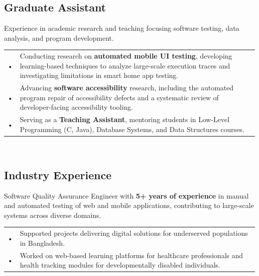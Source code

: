 \documentclass[a4paper]{MagicalCV}
\renewcommand{\sectionsep}{\vspace{2pt}}
\begin{document}
\begin{minipage}[t]{0.66\textwidth}
\sectionsep

\subsection{Graduate Assistant}
Experience in academic research and teaching focusing software testing, data analysis, and program development.

\begin{tabular}{@{}p{0.02cm}p{11cm}@{}}
• & Conducting research on \textbf{automated mobile UI testing}, developing learning-based techniques to analyze large-scale execution traces and investigating limitations in smart home app testing. \\
• & Advancing \textbf{software accessibility} research, including the automated program repair of accessibility defects and a systematic review of developer-facing accessibility tooling. \\
• & Serving as a \textbf{Teaching Assistant}, mentoring students in Low-Level Programming (C, Java), Database Systems, and Data Structures courses. \\
\end{tabular} \\
\sectionsep


\subsection{Industry Experience}




Software Quality Assurance Engineer with \textbf{5+ years of experience} in manual and automated testing of web and mobile applications, contributing to large-scale systems across diverse domains.

\begin{tabular}{@{}p{0.02cm}p{11cm}@{}}
• & Supported projects delivering digital solutions for underserved populations in Bangladesh. \\
• & Worked on web-based learning platforms for healthcare professionals and health tracking modules for developmentally disabled individuals. \\
\end{tabular}

\vspace{\topsep}
\sectionsep


\end{minipage}
\end{document}
